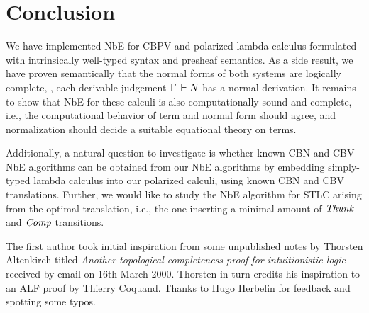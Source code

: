 \documentclass[sigplan,screen]{acmart}
\begin{document}
\section{Conclusion}
\label{sec:concl}

We have implemented NbE for CBPV and polarized lambda calculus
formulated with intrinsically well-typed syntax and presheaf
semantics.  As a side result, we have proven semantically
that the normal forms of both systems are logically complete, \ie,
each derivable judgement $\Gamma \,\vdash N$ has a normal derivation.
It remains to show that NbE for these calculi is also computationally
sound and complete, i.e., the computational behavior of term and
normal form should agree, and normalization should decide a suitable
equational theory on terms.

Additionally, a natural question to investigate is whether known CBN
and CBV NbE algorithms can be obtained from our NbE algorithms by
embedding simply-typed lambda calculus into our polarized calculi,
using known CBN and CBV translations.  Further, we would like to study
the NbE algorithm for STLC arising from the optimal translation, i.e.,
the one inserting a minimal amount of $\mathit{Thunk}$ and $\mathit{Comp}$ transitions.


\begin{acks}
The first author took initial inspiration from some
  unpublished notes by Thorsten Altenkirch titled
\emph{Another topological completeness proof for intuitionistic logic}
received by email on 16th March 2000.
Thorsten in turn credits his inspiration to an ALF proof by Thierry
Coquand.  Thanks to Hugo Herbelin for feedback and spotting some typos.
\end{acks}




\end{document}
